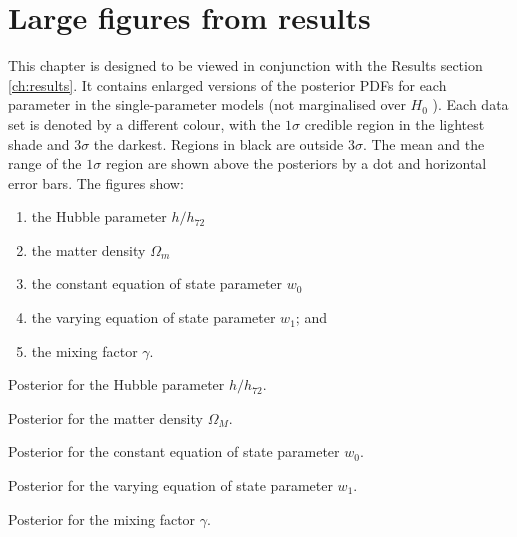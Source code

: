 \chapter{Large figures from results}
\label{app:large-figures}

This chapter is designed to be viewed in conjunction with the Results section \cref{ch:results}. It contains enlarged versions of the posterior PDFs for each parameter in the single-parameter models (not marginalised over $H_0$ ). Each data set is denoted by a different colour, with the $1\sigma$ credible region in the lightest shade and $3\sigma$ the darkest. Regions in black are outside $3\sigma$. The mean and the range of the $1\sigma$ region are shown above the posteriors by a dot and horizontal error bars. The figures show:
\begin{enumerate}
\renewcommand{\labelenumi}{(\alph{enumi})}
    \item the Hubble parameter $h/h_{72}$
    \item the matter density $\Omega_m$
    \item the constant equation of state parameter $w_0$
    \item the varying equation of state parameter $w_1$; and
    \item the mixing factor $\gamma$.
\end{enumerate}

  {Posterior for the Hubble parameter $h/h_{72}$.}

  {Posterior for the matter density $\Omega_M$.}

  {Posterior for the constant equation of state parameter $w_0$.}

  {Posterior for the varying equation of state parameter $w_1$.}

  {Posterior for the mixing factor $\gamma$.}
